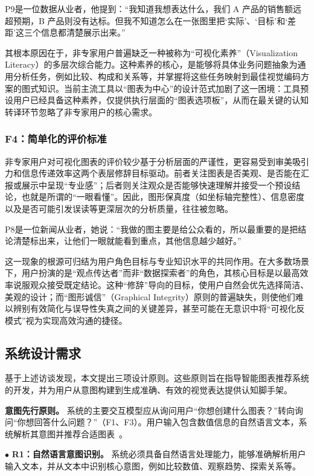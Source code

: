 P9是一位数据从业者，他提到：“我知道我想表达什么，我们 A 产品的销售额远超预期，B 产品则没有达标。但我不知道怎么在一张图里把‘实际’、‘目标’和‘差距’这三个信息都清楚展示出来。”

其根本原因在于，非专家用户普遍缺乏一种被称为“可视化素养”（Visualization Literacy）的多层次综合能力。这种素养的核心，是能够将具体业务问题抽象为通用分析任务，例如比较、构成和关系等，并掌握将这些任务映射到最佳视觉编码方案的图式知识。当前主流工具以“图表为中心”的设计范式加剧了这一困境：工具预设用户已经具备这种素养，仅提供执行层面的“图表选项板”，从而在最关键的认知转译环节忽略了非专家用户的核心需求。

\subsubsection{F4：简单化的评价标准}

非专家用户对可视化图表的评价较少基于分析层面的严谨性，更容易受到审美吸引力和信息传递效率这两个表层修辞目标驱动。前者关注图表是否美观、是否能在汇报或展示中呈现“专业感”；后者则关注观众是否能够快速理解并接受一个预设结论，也就是所谓的“一眼看懂”。因此，图形保真度（如坐标轴完整性）、信息密度以及是否可能引发误读等更深层次的分析质量，往往被忽略。

P8是一位新闻从业者，她说：“我做的图主要是给公众看的，所以最重要的是把结论清楚标出来，让他们一眼就能看到重点，其他信息越少越好。”

这一现象的根源可归结为用户角色目标与专业知识水平的共同作用。在大多数场景下，用户扮演的是“观点传达者”而非“数据探索者”的角色，其核心目标是以最高效率说服观众接受既定结论。这种“修辞”导向的目标，使用户自然会优先选择简洁、美观的设计；而“图形诚信”（Graphical Integrity）原则的普遍缺失，则使他们难以辨别有效简化与误导性失真之间的关键差异，甚至可能在无意识中将“可视化反模式”视为实现高效沟通的捷径。

\subsection{系统设计需求}

基于上述访谈发现，本文提出三项设计原则。这些原则旨在指导智能图表推荐系统的开发，并为用户从意图构建到生成准确、有效的视觉表达提供认知脚手架。

\noindent\textbf{意图先行原则。}
系统的主要交互模型应从询问用户“你想创建什么图表？”转向询问“你想回答什么问题？”（F1、F3）。用户输入包含数值信息的自然语言文本，系统解析其意图并推荐合适图表~\cite{latif2022kori,masry2023unichart,tian2024chartgpt,wang2022towards}。

$\bullet$ \textbf{R1：自然语言意图识别。}
系统必须具备自然语言处理能力，能够准确解析用户输入文本，并从文本中识别核心意图，例如比较数值、观察趋势、探索关系等。

